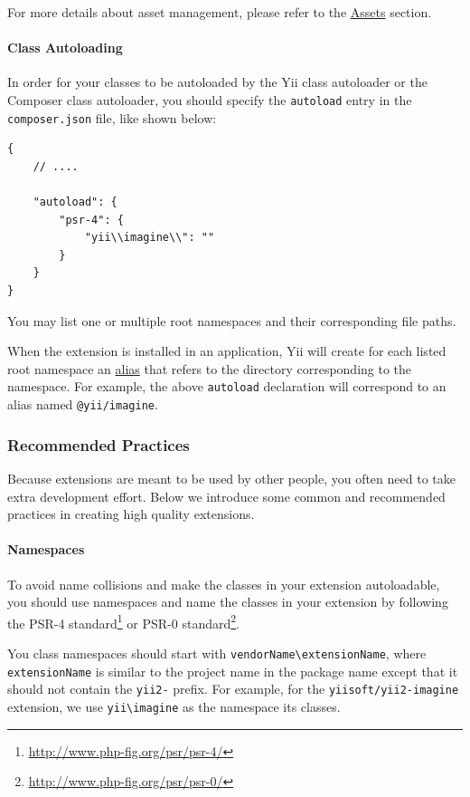 For more details about asset management, please refer to the \hyperref[structure-assets.md::bower-npm-assets]{Assets} section.

\paragraph{Class Autoloading \label{structure-extensions.md::class-autoloading}}
In order for your classes to be autoloaded by the Yii class autoloader or the Composer class autoloader,
you should specify the \lstinline|autoload| entry in the \lstinline|composer.json| file, like shown below:

\lstset{language=json}\begin{lstlisting}
{
    // ....

    "autoload": {
        "psr-4": {
            "yii\\imagine\\": ""
        }
    }
}
\end{lstlisting}
You may list one or multiple root namespaces and their corresponding file paths.

When the extension is installed in an application, Yii will create for each listed root namespace
an \hyperref[concept-aliases.md::extension-aliases]{alias} that refers to the directory corresponding to the namespace.
For example, the above \lstinline|autoload| declaration will correspond to an alias named \lstinline|@yii/imagine|.

\subsubsection{Recommended Practices \label{structure-extensions.md::recommended-practices}}
Because extensions are meant to be used by other people, you often need to take extra development effort. Below
we introduce some common and recommended practices in creating high quality extensions.

\paragraph{Namespaces \label{structure-extensions.md::namespaces}}
To avoid name collisions and make the classes in your extension autoloadable, you should use namespaces and
name the classes in your extension by following the PSR-4 standard\footnote{\url{http://www.php-fig.org/psr/psr-4/}} or
PSR-0 standard\footnote{\url{http://www.php-fig.org/psr/psr-0/}}.

You class namespaces should start with \lstinline|vendorName\extensionName|, where \lstinline|extensionName| is similar to the project name
in the package name except that it should not contain the \lstinline|yii2-| prefix. For example, for the \lstinline|yiisoft/yii2-imagine|
extension, we use \lstinline|yii\imagine| as the namespace its classes.

